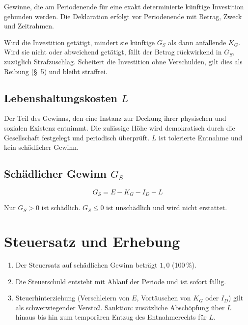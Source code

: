 \documentclass[11pt,a4paper]{article}
\begin{document}
Gewinne, die am Periodenende für eine exakt determinierte künftige Investition gebunden werden. Die Deklaration erfolgt vor Periodenende mit Betrag, Zweck und Zeitrahmen.

Wird die Investition getätigt, mindert sie künftige \( G_S \) als dann anfallende \( K_G \). Wird sie nicht oder abweichend getätigt, fällt der Betrag rückwirkend in \( G_S \), zuzüglich Strafzuschlag. Scheitert die Investition ohne Verschulden, gilt dies als Reibung (\S~5) und bleibt straffrei.

\subsection{Lebenshaltungskosten \( L \)}

Der Teil des Gewinns, den eine Instanz zur Deckung ihrer physischen und sozialen Existenz entnimmt. Die zulässige Höhe wird demokratisch durch die Gesellschaft festgelegt und periodisch überprüft. \( L \) ist tolerierte Entnahme und kein schädlicher Gewinn.

\subsection{Schädlicher Gewinn \( G_S \)}

\begin{equation}
\boxed{G_S = E - K_G - I_D - L}
\end{equation}

Nur \( G_S > 0 \) ist schädlich. \( G_S \leq 0 \) ist unschädlich und wird nicht erstattet.

\section{Steuersatz und Erhebung}

\begin{enumerate}
  \item[(1)] Der Steuersatz auf schädlichen Gewinn beträgt \( 1{,}0 \) (100\,\%).
  
  \item[(2)] Die Steuerschuld entsteht mit Ablauf der Periode und ist sofort fällig.
  
  \item[(3)] Steuerhinterziehung (Verschleiern von \( E \), Vortäuschen von \( K_G \) oder \( I_D \)) gilt als schwerwiegender Verstoß. Sanktion: zusätzliche Abschöpfung über \( L \) hinaus bis hin zum temporären Entzug des Entnahmerechts für \( L \).
\end{enumerate}
\end{document}
